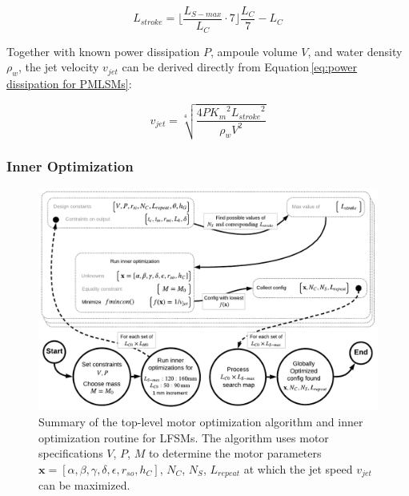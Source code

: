                 
                \begin{equation}
                    L_{stroke} = {\bigg\lfloor  \frac{L_{S-max}}{L_C} \cdot 7 \bigg\rfloor} \frac{L_C}{7} - L_C
                    \label{eq:possible stroke length LFSM stator}
                \end{equation}
                
                
                Together with known power dissipation $P$, ampoule volume $V$, and water density $\rho_w$, the jet velocity $v_{jet}$ can be derived directly from Equation\,\ref{eq:power dissipation for PMLSMs}:
            
            
                \begin{equation}
                    v_{jet} = \sqrt[4]{\frac{4P {K_m}^2 {L_{stroke}}^2}{\rho_w V^2}}
                    \label{eq:v_jet for FSM}
                \end{equation}
                
                
            \subsubsection{Inner Optimization}          \label{Chapter:RSM/LFSM/Optimization/Inner}
                
                
                \begin{figure}
                  \centering
                  \includegraphics[width=5.9in]{chap4/images2/RSM_LFSM_optimization.pdf}
                  \caption{Summary of the top-level motor optimization algorithm and inner optimization routine for \acsp{LFSM}. The algorithm uses motor specifications $V$, $P$, $M$ to determine the motor parameters $\textbf{x}=[\alpha,\beta,\gamma,\delta,\epsilon,r_{so},h_C]$, $N_C$, $N_S$, $L_{repeat}$ at which the jet speed $v_{jet}$ can be maximized.}
                  \label{fig:chapter/rsm/fsm/top level optmization}
                \end{figure}
                
